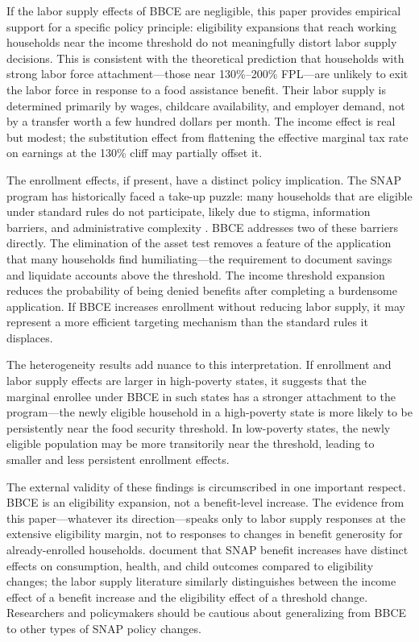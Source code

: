 \documentclass[12pt]{article}
\begin{document}
If the labor supply effects of BBCE are negligible, this paper provides empirical support for a specific policy principle: eligibility expansions that reach working households near the income threshold do not meaningfully distort labor supply decisions. This is consistent with the theoretical prediction that households with strong labor force attachment---those near 130\%--200\% FPL---are unlikely to exit the labor force in response to a food assistance benefit. Their labor supply is determined primarily by wages, childcare availability, and employer demand, not by a transfer worth a few hundred dollars per month. The income effect is real but modest; the substitution effect from flattening the effective marginal tax rate on earnings at the 130\% cliff may partially offset it.

The enrollment effects, if present, have a distinct policy implication. The SNAP program has historically faced a take-up puzzle: many households that are eligible under standard rules do not participate, likely due to stigma, information barriers, and administrative complexity \citep{schanzenbach2019snap}. BBCE addresses two of these barriers directly. The elimination of the asset test removes a feature of the application that many households find humiliating---the requirement to document savings and liquidate accounts above the threshold. The income threshold expansion reduces the probability of being denied benefits after completing a burdensome application. If BBCE increases enrollment without reducing labor supply, it may represent a more efficient targeting mechanism than the standard rules it displaces.

The heterogeneity results add nuance to this interpretation. If enrollment and labor supply effects are larger in high-poverty states, it suggests that the marginal enrollee under BBCE in such states has a stronger attachment to the program---the newly eligible household in a high-poverty state is more likely to be persistently near the food security threshold. In low-poverty states, the newly eligible population may be more transitorily near the threshold, leading to smaller and less persistent enrollment effects.

The external validity of these findings is circumscribed in one important respect. BBCE is an eligibility expansion, not a benefit-level increase. The evidence from this paper---whatever its direction---speaks only to labor supply responses at the extensive eligibility margin, not to responses to changes in benefit generosity for already-enrolled households. \citet{hoynes2016snap} document that SNAP benefit increases have distinct effects on consumption, health, and child outcomes compared to eligibility changes; the labor supply literature similarly distinguishes between the income effect of a benefit increase and the eligibility effect of a threshold change. Researchers and policymakers should be cautious about generalizing from BBCE to other types of SNAP policy changes.
\end{document}

